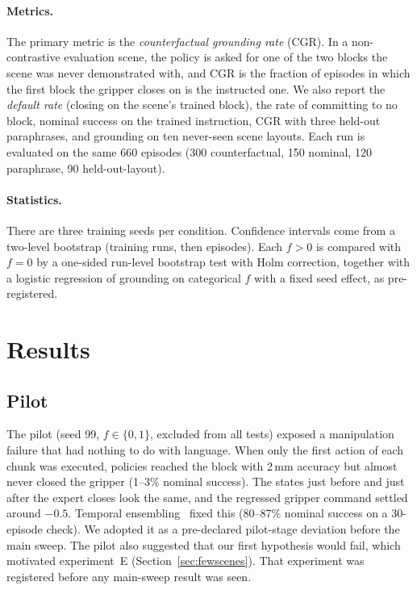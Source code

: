 \documentclass[11pt]{article}
\begin{document}
\paragraph{Metrics.}
The primary metric is the \emph{counterfactual grounding rate} (CGR). In a non-contrastive
evaluation scene, the policy is asked for one of the two blocks the scene was never demonstrated
with, and CGR is the fraction of episodes in which the first block the gripper closes on is the
instructed one. We also report the \emph{default rate} (closing on the scene's trained block), the
rate of committing to no block, nominal success on the trained instruction, CGR with three held-out
paraphrases, and grounding on ten never-seen scene layouts. Each run is evaluated on the same 660
episodes (300 counterfactual, 150 nominal, 120 paraphrase, 90 held-out-layout).

\paragraph{Statistics.}
There are three training seeds per condition. Confidence intervals come from a two-level
bootstrap (training runs, then episodes). Each $f>0$ is compared with $f=0$ by a one-sided
run-level bootstrap test with Holm correction, together with a logistic regression of grounding on
categorical $f$ with a fixed seed effect, as pre-registered.

\section{Results}

\subsection{Pilot}
The pilot (seed 99, $f\in\{0,1\}$, excluded from all tests) exposed a manipulation failure that
had nothing to do with language. When only the first action of each chunk was executed, policies
reached the block with 2\,mm accuracy but almost never closed the gripper (1--3\% nominal success).
The states just before and just after the expert closes look the same, and the regressed gripper
command settled around $-0.5$. Temporal ensembling~\citep{zhao2023act} fixed this (80--87\%
nominal success on a 30-episode check). We adopted it as a pre-declared pilot-stage deviation
before the main sweep. The pilot also suggested that our first hypothesis would fail, which
motivated experiment~E (Section~\ref{sec:fewscenes}). That experiment was registered before any
main-sweep result was seen.
\end{document}

